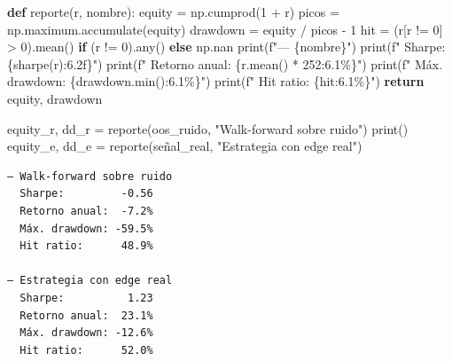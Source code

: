 \documentclass[
  spanish,
  letterpaper,
  DIV=11,
  numbers=noendperiod]{scrreprt}
\newenvironment{Shaded}{\begin{snugshade}}{\end{snugshade}}
\newcommand{\BuiltInTok}[1]{\textcolor[rgb]{0.00,0.23,0.31}{#1}}
\newcommand{\ControlFlowTok}[1]{\textcolor[rgb]{0.00,0.23,0.31}{\textbf{#1}}}
\newcommand{\DecValTok}[1]{\textcolor[rgb]{0.68,0.00,0.00}{#1}}
\newcommand{\KeywordTok}[1]{\textcolor[rgb]{0.00,0.23,0.31}{\textbf{#1}}}
\newcommand{\NormalTok}[1]{\textcolor[rgb]{0.00,0.23,0.31}{#1}}
\newcommand{\OperatorTok}[1]{\textcolor[rgb]{0.37,0.37,0.37}{#1}}
\newcommand{\SpecialCharTok}[1]{\textcolor[rgb]{0.37,0.37,0.37}{#1}}
\newcommand{\SpecialStringTok}[1]{\textcolor[rgb]{0.13,0.47,0.30}{#1}}
\newcommand{\StringTok}[1]{\textcolor[rgb]{0.13,0.47,0.30}{#1}}
\begin{document}
\label{metricas}
\begin{Shaded}
\begin{Highlighting}[]
\KeywordTok{def}\NormalTok{ reporte(r, nombre):}
\NormalTok{    equity }\OperatorTok{=}\NormalTok{ np.cumprod(}\DecValTok{1} \OperatorTok{+}\NormalTok{ r)}
\NormalTok{    picos }\OperatorTok{=}\NormalTok{ np.maximum.accumulate(equity)}
\NormalTok{    drawdown }\OperatorTok{=}\NormalTok{ equity }\OperatorTok{/}\NormalTok{ picos }\OperatorTok{{-}} \DecValTok{1}
\NormalTok{    hit }\OperatorTok{=}\NormalTok{ (r[r }\OperatorTok{!=} \DecValTok{0}\NormalTok{] }\OperatorTok{\textgreater{}} \DecValTok{0}\NormalTok{).mean() }\ControlFlowTok{if}\NormalTok{ (r }\OperatorTok{!=} \DecValTok{0}\NormalTok{).}\BuiltInTok{any}\NormalTok{() }\ControlFlowTok{else}\NormalTok{ np.nan}
    \BuiltInTok{print}\NormalTok{(}\SpecialStringTok{f"— }\SpecialCharTok{\{}\NormalTok{nombre}\SpecialCharTok{\}}\SpecialStringTok{"}\NormalTok{)}
    \BuiltInTok{print}\NormalTok{(}\SpecialStringTok{f"  Sharpe:        }\SpecialCharTok{\{}\NormalTok{sharpe(r)}\SpecialCharTok{:6.2f\}}\SpecialStringTok{"}\NormalTok{)}
    \BuiltInTok{print}\NormalTok{(}\SpecialStringTok{f"  Retorno anual: }\SpecialCharTok{\{}\NormalTok{r}\SpecialCharTok{.}\NormalTok{mean() }\OperatorTok{*} \DecValTok{252}\SpecialCharTok{:6.1\%\}}\SpecialStringTok{"}\NormalTok{)}
    \BuiltInTok{print}\NormalTok{(}\SpecialStringTok{f"  Máx. drawdown: }\SpecialCharTok{\{}\NormalTok{drawdown}\SpecialCharTok{.}\BuiltInTok{min}\NormalTok{()}\SpecialCharTok{:6.1\%\}}\SpecialStringTok{"}\NormalTok{)}
    \BuiltInTok{print}\NormalTok{(}\SpecialStringTok{f"  Hit ratio:     }\SpecialCharTok{\{}\NormalTok{hit}\SpecialCharTok{:6.1\%\}}\SpecialStringTok{"}\NormalTok{)}
    \ControlFlowTok{return}\NormalTok{ equity, drawdown}

\NormalTok{equity\_r, dd\_r }\OperatorTok{=}\NormalTok{ reporte(oos\_ruido, }\StringTok{"Walk{-}forward sobre ruido"}\NormalTok{)}
\BuiltInTok{print}\NormalTok{()}
\NormalTok{equity\_e, dd\_e }\OperatorTok{=}\NormalTok{ reporte(señal\_real, }\StringTok{"Estrategia con edge real"}\NormalTok{)}
\end{Highlighting}
\end{Shaded}

\begin{verbatim}
— Walk-forward sobre ruido
  Sharpe:         -0.56
  Retorno anual:  -7.2%
  Máx. drawdown: -59.5%
  Hit ratio:      48.9%

— Estrategia con edge real
  Sharpe:          1.23
  Retorno anual:  23.1%
  Máx. drawdown: -12.6%
  Hit ratio:      52.0%
\end{verbatim}
\end{document}
